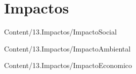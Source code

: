 \section{Impactos}

{Content/13.Impactos/ImpactoSocial}

{Content/13.Impactos/ImpactoAmbiental}

{Content/13.Impactos/ImpactoEconomico}
